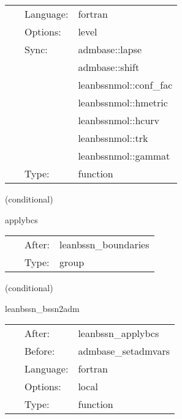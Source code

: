 \hspace{5mm}{\it mol boundary enforcement } 


\hspace{5mm}

 \begin{tabular*}{160mm}{cll} 
~ & Language:  & fortran \\ 
~ & Options:  & level \\ 
~ & Sync:  & admbase::lapse \\ 
~& ~ &admbase::shift\\ 
~& ~ &leanbssnmol::conf\_fac\\ 
~& ~ &leanbssnmol::hmetric\\ 
~& ~ &leanbssnmol::hcurv\\ 
~& ~ &leanbssnmol::trk\\ 
~& ~ &leanbssnmol::gammat\\ 
~ & Type:  & function \\ 
\end{tabular*} 


\vspace{5mm}

   (conditional) 

\hspace{5mm} applybcs 

\hspace{5mm}{\it apply boundary conditions } 


\hspace{5mm}

 \begin{tabular*}{160mm}{cll} 
~ & After:  & leanbssn\_boundaries \\ 
~ & Type:  & group \\ 
\end{tabular*} 


\vspace{5mm}

   (conditional) 

\hspace{5mm} leanbssn\_bssn2adm 

\hspace{5mm}{\it convert variables back to the adm ones } 


\hspace{5mm}

 \begin{tabular*}{160mm}{cll} 
~ & After:  & leanbssn\_applybcs \\ 
~ & Before:  & admbase\_setadmvars \\ 
~ & Language:  & fortran \\ 
~ & Options:  & local \\ 
~ & Type:  & function \\ 
\end{tabular*} 



